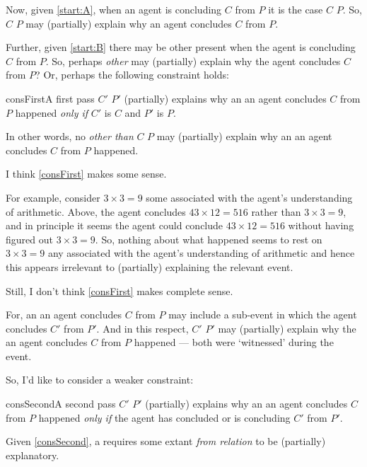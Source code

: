 \begin{note}
  Now, given \ref{start:A}, when an agent is concluding \(C\) from \(P\) it is the case \(C\) \fof{} \(P\).
  So, \(C\)  \(P\) may (partially) explain why an agent concludes \(C\) from \(P\).

  Further, given \ref{start:B} there may be other  present when the agent is concluding \(C\) from \(P\).
  So, perhaps \emph{other}  may (partially) explain why the agent concludes \(C\) from \(P\)?
  Or, perhaps the following constraint holds:

  \begin{constraint}{consFirst}{A first pass}
    \(C'\) \fingf{} \(P'\) (partially) explains why an  an agent concludes \(C\) from \(P\) happened \emph{only if} \(C'\) is \(C\) and \(P'\) is \(P\).
  \end{constraint}

  \noindent%
  In other words, no \fingfr{} \emph{other than} \(C\) \fingf{} \(P\) may (partially) explain why an  an agent concludes \(C\) from \(P\) happened.
\end{note}


\begin{note}
  I think \autoref{consFirst} makes some sense.

  For example, consider \(3 \times 3 = 9\) \fingf{} some \pool{} associated with the agent's understanding of arithmetic.
  Above, the agent concludes \(43 \times 12 = 516\) rather than \(3 \times 3 = 9\), and in principle it seems the agent could conclude \(43 \times 12 = 516\) without having figured out \(3 \times 3 = 9\).
  So, nothing about what happened seems to rest on \(3 \times 3 = 9\) \fingf{} any \pool{} associated with the agent's understanding of arithmetic and hence this \fingfr{} appears irrelevant to (partially) explaining the relevant event.
\end{note}


\begin{note}
  Still, I don't think \autoref{consFirst} makes complete sense.

  For, an  an agent concludes \(C\) from \(P\) may include a sub-event in which the agent concludes \(C'\) from \(P'\).
  And in this respect, \(C'\) \fingf{} \(P'\) may (partially) explain why the  an agent concludes \(C\) from \(P\) happened --- both  were `witnessed' during the event.

  So, I'd like to consider a weaker constraint:

  \begin{constraint}{consSecond}{A second pass}
    \(C'\) \fingf{} \(P'\) (partially) explains why an  an agent concludes \(C\) from \(P\) happened \emph{only if} the agent has concluded or is concluding \(C'\) from \(P'\).
  \end{constraint}

  \noindent%
  Given \autoref{consSecond}, a \emph{\fingfr{}} requires some extant \emph{from relation} to be (partially) explanatory.
\end{note}



